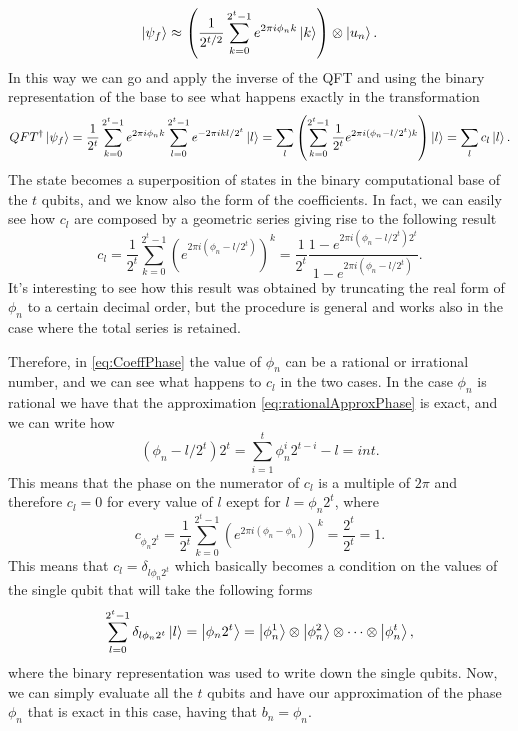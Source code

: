 {    \begin{equation}
        \ket{\psi_f} \approx \left( \frac{1}{2^{t/2}}\sum_{k=0}^{2^t-1}e^{2\pi i\phi_nk}\ket{k} \right)\otimes\ket{u_n}.
    \end{equation}
    In this way we can go and apply the inverse of the QFT and using the binary representation of the base to see what happens exactly in the transformation
    \begin{equation}
        QFT^\dagger \ket{\psi_f} = \frac{1}{2^t}\sum_{k=0}^{2^t-1} e^{2\pi i\phi_nk}\sum_{l=0}^{2^t-1} e^{-2\pi ikl/2^t}\ket{l} = \sum_l\left( \sum_{k=0}^{2^t-1}\frac{1}{2^t}e^{2\pi i (\phi_n - l/2^t)k} \right)\ket{l} = \sum_l c_l\ket{l}.
    \end{equation}
    The state becomes a superposition of states in the binary computational base of the $t$ qubits, and we know also the form of the coefficients. In fact, we can easily see how $c_l$ are composed by a geometric series giving rise to the following result
    \begin{equation}
        \label{eq:CoeffPhase}
        c_l = \frac{1}{2^t} \sum_{k=0}^{2^t-1} \left( e^{2\pi i (\phi_n - l/2^t)} \right)^k = \frac{1}{2^t}\frac{1 - e^{2\pi i (\phi_n - l/2^t)2^t}}{1 - e^{2\pi i (\phi_n - l/2^t)}}.  
    \end{equation}
    It's interesting to see how this result was obtained by truncating the real form of $\phi_n$ to a certain decimal order, but the procedure is general and works also in the case where the total series is retained. 
    
    Therefore, in \eqref{eq:CoeffPhase} the value of $\phi_n$ can be a rational or irrational number, and we can see what happens to $c_l$ in the two cases. In the case $\phi_n$ is rational we have that the approximation \eqref{eq:rationalApproxPhase} is exact, and we can write how
    \begin{equation}
        (\phi_n - l/2^t)2^t = \sum_{i=1}^t \phi_n^i 2^{t-i} -l = int.
    \end{equation}
    This means that the phase on the numerator of $c_l$ is a multiple of $2\pi$ and therefore $c_l = 0$ for every value of $l$ exept for $l=\phi_n 2^t$, where
    \begin{equation}
        c_{\phi_n2^t} = \frac{1}{2^t} \sum_{k=0}^{2^t-1} \left( e^{2\pi i (\phi_n - \phi_n)} \right)^k = \frac{2^t}{2^t} = 1.
    \end{equation}
    This means that $c_l = \delta_{l\phi_n2^t}$ which basically becomes a condition on the values of the single qubit that will take the following forms
    \begin{equation}
        \sum_{l=0}^{2^t-1} \delta_{l\phi_n2^t}\ket{l} = \ket{\phi_n2^t} = \ket{\phi_n^1}\otimes\ket{\phi_n^2}\otimes\dots\otimes\ket{\phi_n^t}, 
    \end{equation}
    where the binary representation was used to write down the single qubits. Now, we can simply evaluate all the $t$ qubits and have our approximation of the phase $\phi_n$ that is exact in this case, having that $b_n = \phi_n$.

}
